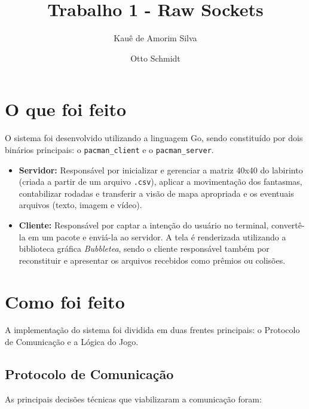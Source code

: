\documentclass[12pt,a4paper]{article}
\title{\vspace{-1.5cm}Trabalho 1 - Raw Sockets}
\author{Kauê de Amorim Silva \and Otto Schmidt}
\date{\vspace{-1cm}}
\begin{document}
\maketitle

\section{O que foi feito}

O sistema foi desenvolvido utilizando a linguagem Go, sendo constituído por dois binários principais: o \texttt{pacman\_client} e o \texttt{pacman\_server}.

\begin{itemize}
    \item \textbf{Servidor:} Responsável por inicializar e gerenciar a matriz 40x40 do labirinto (criada a partir de um arquivo \texttt{.csv}), aplicar a movimentação dos fantasmas, contabilizar rodadas e transferir a visão de mapa apropriada e os eventuais arquivos (texto, imagem e vídeo).
    \item \textbf{Cliente:} Responsável por captar a intenção do usuário no terminal, convertê-la em um pacote e enviá-la ao servidor. A tela é renderizada utilizando a biblioteca gráfica \textit{Bubbletea}, sendo o cliente responsável também por reconstituir e apresentar os arquivos recebidos como prêmios ou colisões.
\end{itemize}

\section{Como foi feito}

A implementação do sistema foi dividida em duas frentes principais: o Protocolo de Comunicação e a Lógica do Jogo.

\subsection{Protocolo de Comunicação}

As principais decisões técnicas que viabilizaram a comunicação foram:
\end{document}
